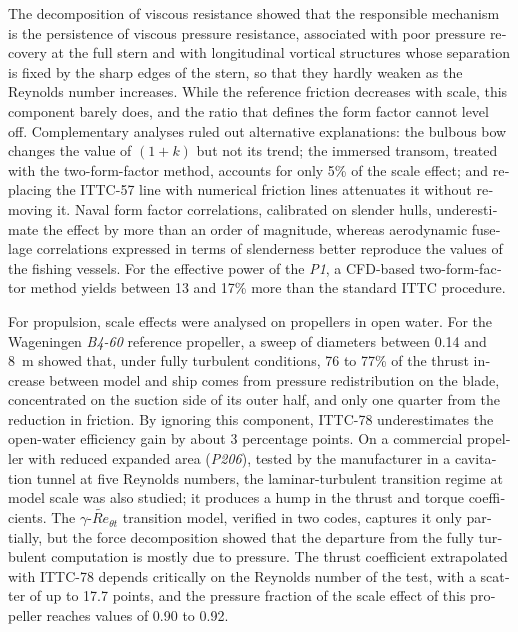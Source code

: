 \begin{otherlanguage}{english}
\begin{ResumenPlantilla}
The decomposition of viscous resistance showed that the responsible mechanism is
the persistence of viscous pressure resistance, associated with poor pressure
recovery at the full stern and with longitudinal vortical structures whose
separation is fixed by the sharp edges of the stern, so that they hardly weaken
as the Reynolds number increases. While the reference friction decreases with
scale, this component barely does, and the ratio that defines the form factor
cannot level off. Complementary analyses ruled out alternative explanations: the
bulbous bow changes the value of $(1+k)$ but not its trend; the immersed transom,
treated with the two-form-factor method, accounts for only 5\% of the scale
effect; and replacing the ITTC-57 line with numerical friction lines attenuates
it without removing it. Naval form factor correlations, calibrated on slender
hulls, underestimate the effect by more than an order of magnitude, whereas
aerodynamic fuselage correlations expressed in terms of slenderness better
reproduce the values of the fishing vessels. For the effective power of the
\textit{P1}, a CFD-based two-form-factor method yields between 13 and 17\% more
than the standard ITTC procedure.

For propulsion, scale effects were analysed on propellers in open water. For the
Wageningen \textit{B4-60} reference propeller, a sweep of diameters between 0.14
and 8~m showed that, under fully turbulent conditions, 76 to 77\% of the thrust
increase between model and ship comes from pressure redistribution on the blade,
concentrated on the suction side of its outer half, and only one quarter from the
reduction in friction. By ignoring this component, ITTC-78 underestimates the
open-water efficiency gain by about 3 percentage points. On a commercial
propeller with reduced expanded area (\textit{P206}), tested by the manufacturer
in a cavitation tunnel at five Reynolds numbers, the laminar-turbulent transition
regime at model scale was also studied; it produces a hump in the thrust and
torque coefficients. The $\gamma$-$\widetilde{Re}_{\theta t}$ transition model,
verified in two codes, captures it only partially, but the force decomposition
showed that the departure from the fully turbulent computation is mostly due to
pressure. The thrust coefficient extrapolated with ITTC-78 depends critically on
the Reynolds number of the test, with a scatter of up to 17.7 points, and the
pressure fraction of the scale effect of this propeller reaches values of 0.90
to 0.92.


\end{ResumenPlantilla}
\end{otherlanguage}
